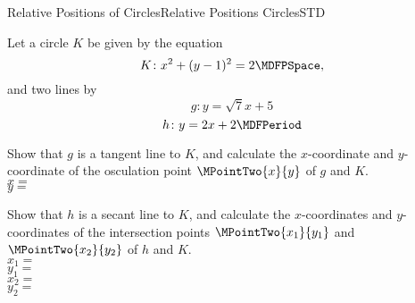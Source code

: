 \begin{MXContent}{Relative Positions of Circles}{Relative Positions Circles}{STD}
\begin{MExercise}
Let a circle $K$ be given by the equation 
\[
 K\colon x^2+(y-1)^2=2 \MDFPSpace , 
\]
and two lines by
\[
 g\colon y=\sqrt{7}x+5
\]
\[
 h\colon y=2x+2 \MDFPeriod
\]
\begin{MExerciseItems}
\item{Show that $g$ is a tangent line to $K$, and calculate the $x$-coordinate and $y$-coordinate of the osculation point 
  $\MPointTwo{x}{y}$ of $g$ and $K$.\\
$x=$\\
$y=$
} 
\item{Show that $h$ is a secant line to $K$, and calculate the $x$-coordinates and $y$-coordinates of the intersection 
  points $\MPointTwo{x_1}{y_1}$ and $\MPointTwo{x_2}{y_2}$ of $h$ and $K$.\\
$x_1=$\\
$y_1=$\\
$x_2=$\\
$y_2=$
} 
\end{MExerciseItems}


\end{MExercise}
\end{MXContent}
